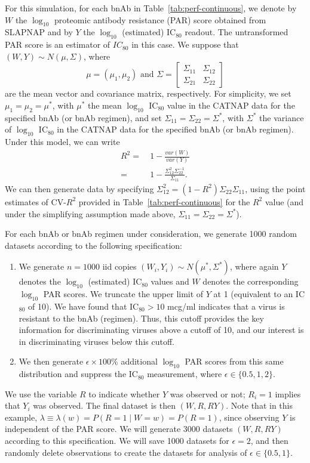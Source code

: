 \documentclass[10pt]{article}
\begin{document}
For this simulation, for each bnAb in Table~\ref{tab:perf-continuous}, we denote by $W$ the $\log_{10}$ proteomic antibody resistance (PAR) score obtained from SLAPNAP and by $Y$ the $\log_{10}$ (estimated) IC$_{80}$ readout. The untransformed PAR score is an estimator of $IC_{80}$ in this case. We suppose that $(W,Y) \sim N(\mu, \Sigma)$, where
$$\mu = (\mu_1, \mu_2) \text{ and } \Sigma = \begin{bmatrix} \Sigma_{11} & \Sigma_{12} \\ \Sigma_{21} & \Sigma_{22} \end{bmatrix}$$ are the mean vector and covariance matrix, respectively. For simplicity, we set $\mu_1 = \mu_2 = \mu^*$, with $\mu^*$ the mean $\log_{10}$ IC$_{80}$ value in the CATNAP data \citep{yoon2015} for the specified bnAb (or bnAb regimen), and set $\Sigma_{11} = \Sigma_{22} = \Sigma^*$, with $\Sigma^*$ the variance of $\log_{10}$ IC$_{80}$ in the CATNAP data for the specified bnAb (or bnAb regimen). Under this model, we can write
\begin{align*}
    R^2 =& \ 1 - \frac{var(W)}{var(Y)} \\
    =& \ 1 - \frac{\Sigma_{12}^2\Sigma_{22}^{-1}}{\Sigma_{11}}.
\end{align*}
We can then generate data by specifying $\Sigma_{12}^2 = (1 - R^2)\Sigma_{22}\Sigma_{11}$, using the point estimates of CV-$R^2$ provided in Table~\ref{tab:perf-continuous} for the $R^2$ value (and under the simplifying assumption made above, $\Sigma_{11} = \Sigma_{22} = \Sigma^*$).

For each bnAb or bnAb regimen under consideration, we generate 1000 random datasets according to the following specification:
\begin{enumerate}
    \item We generate $n = 1000$ iid copies $(W_i, Y_i) \sim N(\mu^*, \Sigma^*)$, where again $Y$ denotes the $\log_{10}$ (estimated) IC$_{80}$ values and $W$ denotes the corresponding $\log_{10}$ PAR scores. We truncate the upper limit of $Y$ at 1 (equivalent to an IC$_{80}$ of 10). We have found that IC$_{80} > 10$ mcg/ml indicates that a virus is resistant to the bnAb (regimen). Thus, this cutoff provides the key information for discriminating viruses above a cutoff of 10, and our interest is in discriminating viruses below this cutoff.
    \item We then generate $\epsilon \times 100$\% additional $\log_{10}$ PAR scores from this same distribution and suppress the IC$_{80}$ measurement, where $\epsilon \in \{0.5, 1, 2\}$.
\end{enumerate}
We use the variable $R$ to indicate whether $Y$ was observed or not; $R_i = 1$ implies that $Y_i$ was observed. The final dataset is then $(W, R, RY)$. Note that in this example, $\lambda \equiv \lambda(w) = P(R = 1 \mid W = w) = P(R = 1)$, since observing $Y$ is independent of the PAR score. We will generate 3000 datasets $(W, R, RY)$ according to this specification. We will save 1000 datasets for $\epsilon = 2$, and then randomly delete observations to create the datasets for analysis of $\epsilon \in \{0.5, 1\}$.
\end{document}
